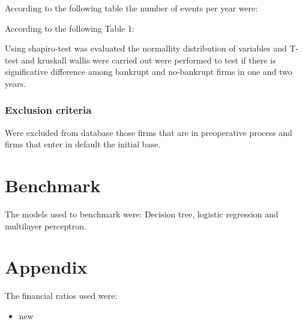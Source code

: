 \documentclass[journal]{IEEEtai}
\begin{document}
According  to the following table the number of events per year were:

According to the following Table 1:

Using shapiro-test was evaluated the normallity distribution of variables and T-test and kruskall wallis were carried out were performed to test if there is significative difference among bankrupt and no-bankrupt firms in one and two years.

\subsubsection{Exclusion criteria}
Were excluded from database those firms that are in preoperative process and firms that enter in default the initial base.	




\section{Benchmark}

The models used to benchmark were: Decision tree, logistic regression and multilayer perceptron.







\section{Appendix}
The financial ratios used were:

\begin{itemize}
\item new
\end{itemize}

\newpage
\printbibliography
\end{document}
